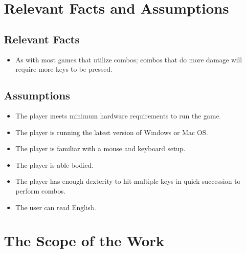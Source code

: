 \documentclass{article}
\begin{document}
	\section{Relevant Facts and Assumptions}
	\subsection{Relevant Facts}

	\begin{itemize}
	    \item As with most games that utilize combos; combos that do more damage will require more keys to be pressed.
	\end{itemize}
	\subsection{Assumptions}
	\begin{itemize}
		\item The player meets minimum hardware requirements to run the game.
		\item The player is running the latest version of Windows or Mac OS.
		\item The player is familiar with a mouse and keyboard setup.
		\item The player is able-bodied.
		\item The player has enough dexterity to hit multiple keys in quick succession to perform combos.
		\item The user can read English.
	\end{itemize}

	\section{The Scope of the Work}
\end{document}
